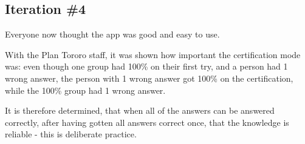 \subsection{Iteration \#4}

Everyone now thought the app was good and easy to use.

With the Plan Tororo staff, it was shown how important the certification mode was: even though one group had 100\% on their first try, and a person had 1 wrong answer, the person with 1 wrong answer got 100\% on the certification, while the 100\% group had 1 wrong answer.

It is therefore determined, that when all of the answers can be answered correctly, after having gotten all answers correct once, that the knowledge is reliable - this is deliberate practice.
